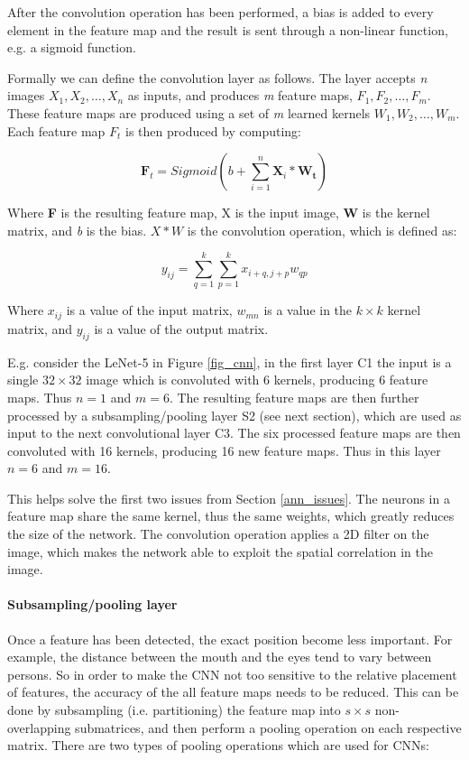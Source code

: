 After the convolution operation has been performed, a bias is added to every element in the feature map and the result is sent through a non-linear function, e.g. a sigmoid function.

Formally we can define the convolution layer as follows. The layer accepts \textit{n} images $ X_1, X_2, \dots, X_n $ as inputs, and produces \textit{m} feature maps, $F_1, F_2, \dots, F_m $. These feature maps are produced using a set of \textit{m} learned kernels $ W_1, W_2, \dots, W_m $.  Each feature map $ F_t $ is then produced by computing:
 

\begin{equation}
\mathbf{F}_t = Sigmoid(b+\sum_{i=1}^{n}\mathbf{X}_i*\mathbf{W_t})
\end{equation}

Where \textbf{F} is the resulting feature map, X is the input image, \textbf{W} is the kernel matrix, and \textit{b} is the bias. $ X * W $ is the convolution operation, which is defined as:

\begin{equation}
y_{ij} = \sum_{q=1}^{k}\sum_{p=1}^{k} x_{i+q, j+p}w_{qp}
\end{equation}

Where $ x_{ij} $ is a value of the input matrix, $ w_{mn} $ is a value in the $ k \times k $ kernel matrix, and $ y_{ij} $ is a value of the output matrix.

E.g. consider the LeNet-5 in Figure \ref{fig_cnn}, in the first layer C1 the input is a single $ 32 \times 32 $ image which is convoluted with 6 kernels, producing 6 feature maps. Thus $ n = 1 $ and $ m = 6 $. The resulting feature maps are then further processed by a subsampling/pooling layer S2 (see next section), which are used as input to the next convolutional layer C3. The six processed feature maps are then convoluted with 16 kernels, producing 16 new feature maps. Thus in this layer $ n = 6 $ and $ m = 16 $. 



This helps solve the first two issues from Section \ref{ann_issues}. The neurons in a feature map share the same kernel, thus the same weights, which greatly reduces the size of the network. The convolution operation applies a 2D filter on the image, which makes the network able to exploit the spatial correlation in the image. 

\paragraph{Subsampling/pooling layer}  \hfill \break
Once a feature has been detected, the exact position become less important. For example, the distance between the mouth and the eyes tend to vary between persons. So in order to make the CNN not too sensitive to the relative placement of features, the accuracy of the all feature maps needs to be reduced. This can be done by subsampling (i.e. partitioning) the feature map into $ s \times s $ non-overlapping submatrices, and then perform a pooling operation on each respective matrix. There are two types of pooling operations which are used for CNNs: 

